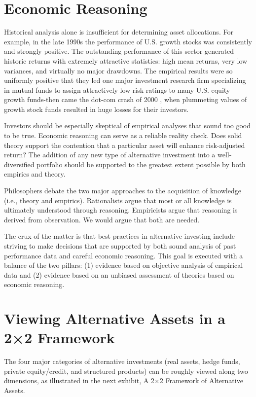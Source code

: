 \documentclass[11pt]{article}
\begin{document}
\section*{Economic Reasoning}
Historical analysis alone is insufficient for determining asset allocations. For example, in the late 1990s the performance of U.S. growth stocks was consistently and strongly positive. The outstanding performance of this sector generated historic returns with extremely attractive statistics: high mean returns, very low variances, and virtually no major drawdowns. The empirical results were so uniformly positive that they led one major investment research firm specializing in mutual funds to assign attractively low risk ratings to many U.S. equity growth funds-then came the dot-com crash of 2000 , when plummeting values of growth stock funds resulted in huge losses for their investors.

Investors should be especially skeptical of empirical analyses that sound too good to be true. Economic reasoning can serve as a reliable reality check. Does solid theory support the contention that a particular asset will enhance risk-adjusted return? The addition of any new type of alternative investment into a well-diversified portfolio should be supported to the greatest extent possible by both empirics and theory.

Philosophers debate the two major approaches to the acquisition of knowledge (i.e., theory and empirics). Rationalists argue that most or all knowledge is ultimately understood through reasoning. Empiricists argue that reasoning is derived from observation. We would argue that both are needed.

The crux of the matter is that best practices in alternative investing include striving to make decisions that are supported by both sound analysis of past performance data and careful economic reasoning. This goal is executed with a balance of the two pillars: (1) evidence based on objective analysis of empirical data and (2) evidence based on an unbiased assessment of theories based on economic reasoning.

\section*{Viewing Alternative Assets in a 2×2 Framework}
The four major categories of alternative investments (real assets, hedge funds, private equity/credit, and structured products) can be roughly viewed along two dimensions, as illustrated in the next exhibit, A 2×2 Framework of Alternative Assets.
\end{document}
